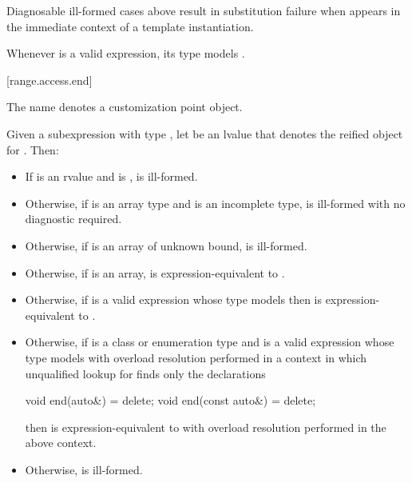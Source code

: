 \pnum
\begin{note}
Diagnosable ill-formed cases above
result in substitution failure when 
appears in the immediate context of a template instantiation.
\end{note}

\pnum
\begin{note}
Whenever  is a valid expression, its type models
.
\end{note}

[range.access.end]{}
%

\pnum
The name  denotes a customization point
object.

\pnum
Given a subexpression  with type ,
let  be an lvalue that denotes the reified object for .
Then:

\begin{itemize}
\item
  If  is an rvalue and
   is ,
   is ill-formed.

\item
  Otherwise, if  is an array type and
   is an incomplete type,
   is ill-formed with no diagnostic required.

\item
  Otherwise, if  is an array of unknown bound,
   is ill-formed.

\item
  Otherwise, if  is an array,
   is expression-equivalent to
  .

\item
  Otherwise, if 
  is a valid expression whose type models
  then  is expression-equivalent to
  .

\item
  Otherwise, if  is a class or enumeration type and
  is a valid expression whose type models
  with overload resolution performed in a context in which
  unqualified lookup for  finds only the declarations
\begin{codeblock}
void end(auto&) = delete;
void end(const auto&) = delete;
\end{codeblock}
  then  is expression-equivalent to
  with overload resolution performed in the above context.

\item
  Otherwise,  is ill-formed.
\end{itemize}

